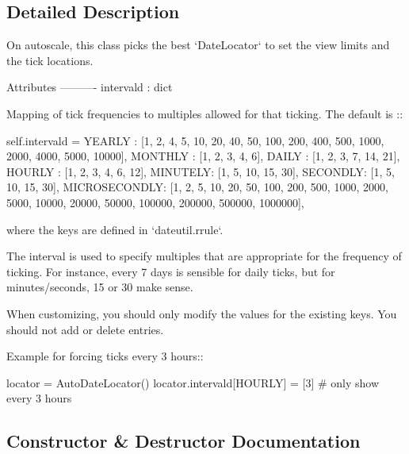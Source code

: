 \subsection{Detailed Description}
\begin{DoxyVerb}On autoscale, this class picks the best `DateLocator` to set the view
limits and the tick locations.

Attributes
----------
intervald : dict

    Mapping of tick frequencies to multiples allowed for that ticking.
    The default is ::

        self.intervald = {
            YEARLY  : [1, 2, 4, 5, 10, 20, 40, 50, 100, 200, 400, 500,
                       1000, 2000, 4000, 5000, 10000],
            MONTHLY : [1, 2, 3, 4, 6],
            DAILY   : [1, 2, 3, 7, 14, 21],
            HOURLY  : [1, 2, 3, 4, 6, 12],
            MINUTELY: [1, 5, 10, 15, 30],
            SECONDLY: [1, 5, 10, 15, 30],
            MICROSECONDLY: [1, 2, 5, 10, 20, 50, 100, 200, 500,
                            1000, 2000, 5000, 10000, 20000, 50000,
                            100000, 200000, 500000, 1000000],
        }

    where the keys are defined in `dateutil.rrule`.

    The interval is used to specify multiples that are appropriate for
    the frequency of ticking. For instance, every 7 days is sensible
    for daily ticks, but for minutes/seconds, 15 or 30 make sense.

    When customizing, you should only modify the values for the existing
    keys. You should not add or delete entries.

    Example for forcing ticks every 3 hours::

        locator = AutoDateLocator()
        locator.intervald[HOURLY] = [3]  # only show every 3 hours
\end{DoxyVerb}
 

\subsection{Constructor \& Destructor Documentation}
\mbox{\label{classmatplotlib_1_1dates_1_1AutoDateLocator_ad00e4d357d7b24a5f51861ee62bcb81d}} 
